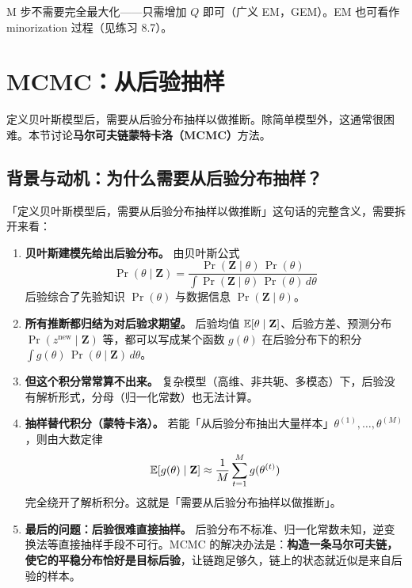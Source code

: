 \begin{remark}
    M 步不需要完全最大化——只需增加 $Q$ 即可（广义 EM，GEM）。EM 也可看作 minorization 过程（见练习 8.7）。
\end{remark}

\section{MCMC：从后验抽样}

定义贝叶斯模型后，需要从后验分布抽样以做推断。除简单模型外，这通常很困难。本节讨论\textbf{马尔可夫链蒙特卡洛（MCMC）}方法。

\subsection{背景与动机：为什么需要从后验分布抽样？}

「定义贝叶斯模型后，需要从后验分布抽样以做推断」这句话的完整含义，需要拆开来看：

\begin{enumerate}
    \item \textbf{贝叶斯建模先给出后验分布。} 由贝叶斯公式
    \[
        \Pr(\theta \mid \mathbf{Z}) = \frac{\Pr(\mathbf{Z} \mid \theta)\,\Pr(\theta)}{\int \Pr(\mathbf{Z} \mid \theta)\,\Pr(\theta)\,d\theta}
    \]
    后验综合了先验知识 $\Pr(\theta)$ 与数据信息 $\Pr(\mathbf{Z}\mid\theta)$。
    \item \textbf{所有推断都归结为对后验求期望。} 后验均值 $\mathbb{E}[\theta\mid\mathbf{Z}]$、后验方差、预测分布 $\Pr(z^{\text{new}}\mid\mathbf{Z})$ 等，都可以写成某个函数 $g(\theta)$ 在后验分布下的积分 $\int g(\theta)\,\Pr(\theta\mid\mathbf{Z})\,d\theta$。
    \item \textbf{但这个积分常常算不出来。} 复杂模型（高维、非共轭、多模态）下，后验没有解析形式，分母（归一化常数）也无法计算。
    \item \textbf{抽样替代积分（蒙特卡洛）。} 若能「从后验分布抽出大量样本」$\theta^{(1)}, \ldots, \theta^{(M)}$，则由大数定律
    \[
        \mathbb{E}[g(\theta)\mid\mathbf{Z}] \approx \frac{1}{M}\sum_{t=1}^{M} g(\theta^{(t)})
    \]
    完全绕开了解析积分。这就是「需要从后验分布抽样以做推断」。
    \item \textbf{最后的问题：后验很难直接抽样。} 后验分布不标准、归一化常数未知，逆变换法等直接抽样手段不可行。MCMC 的解决办法是：\textbf{构造一条马尔可夫链，使它的平稳分布恰好是目标后验}，让链跑足够久，链上的状态就近似是来自后验的样本。
\end{enumerate}

